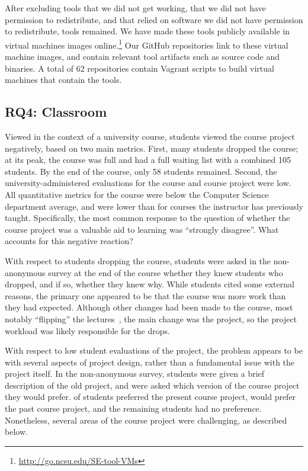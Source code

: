 \documentclass[10pt,conference]{IEEEtran}
\begin{document}
After excluding tools 
that we did not get working,
that we did not have permission to redistribute, and 
that relied on software we did not have permission to redistribute,
\permissionToRedistribute tools remained.
We have made these tools publicly available in virtual machines 
images online.\footnote{\url{http://go.ncsu.edu/SE-tool-VMs}}
Our GitHub repositories link to these virtual machine images,
and contain relevant tool artifacts such as source code
and binaries.
A total of 62 repositories 
contain Vagrant scripts to build 
virtual machines that contain the tools. 

\subsection{RQ4: Classroom}

Viewed in the context of a university course,
students viewed the course project negatively,
based on two main metrics.
First, many students dropped the course; 
at its peak, the course was full and had a full
waiting list with a combined 105 students.
By the end of the course, only 58 students remained.
Second, the university-administered evaluations for
the course and course project were low.
All quantitative metrics for the course were below
the Computer Science department average, and were
lower than for courses the instructor has previously
taught.
Specifically, the most common response to the question
of whether the course project was a valuable aid to learning
was ``strongly disagree''.
What accounts for this negative reaction?

With respect to students dropping the course, students were asked
in the non-anonymous survey at the end of the course whether they knew
students who dropped, and if so, whether they knew why.
While students cited some external reasons, the 
primary one appeared to be that the course was more work
than they had expected.
Although other changes had been made to the course, 
most notably ``flipping'' the lectures~\cite{flipped},
the main change was the project, so the project workload
was likely responsible for the drops.

With respect to low student evaluations of the project,
the problem appears to be with several aspects of project
design, rather than a fundamental issue with the project itself.
In the non-anonymous survey, students were given a brief description
of the old project, and were asked which version of the course project
they would prefer.
\projectLikeThis of students preferred the present course project,
\projectLikeOther would prefer the past course project,
and the remaining students had no preference.
Nonetheless, several areas of the course project were challenging,
as described below.
\end{document}
